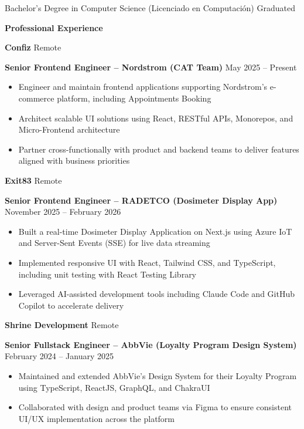 \documentclass[11pt]{article}
\begin{document}
Bachelor's Degree in Computer Science (Licenciado en Computaci\'on) \hfill Graduated

\vspace{12pt}

\begin{center}
    \textbf{Professional Experience}
\end{center}

\textbf{Confiz} \hfill Remote

\textbf{Senior Frontend Engineer -- Nordstrom (CAT Team)} \hfill May 2025 -- Present
\begin{itemize}[noitemsep, topsep=0pt, partopsep=0pt, parsep=0pt]
    \item Engineer and maintain frontend applications supporting Nordstrom's e-commerce platform, including Appointments Booking
    \item Architect scalable UI solutions using React, RESTful APIs, Monorepos, and Micro-Frontend architecture
    \item Partner cross-functionally with product and backend teams to deliver features aligned with business priorities
\end{itemize}

\vspace{12pt}

\textbf{Exit83} \hfill Remote

\textbf{Senior Frontend Engineer -- RADETCO (Dosimeter Display App)} \hfill November 2025 -- February 2026
\begin{itemize}[noitemsep, topsep=0pt, partopsep=0pt, parsep=0pt]
    \item Built a real-time Dosimeter Display Application on Next.js using Azure IoT and Server-Sent Events (SSE) for live data streaming
    \item Implemented responsive UI with React, Tailwind CSS, and TypeScript, including unit testing with React Testing Library
    \item Leveraged AI-assisted development tools including Claude Code and GitHub Copilot to accelerate delivery
\end{itemize}

\vspace{12pt}

\textbf{Shrine Development} \hfill Remote

\textbf{Senior Fullstack Engineer -- AbbVie (Loyalty Program Design System)} \hfill February 2024 -- January 2025
\begin{itemize}[noitemsep, topsep=0pt, partopsep=0pt, parsep=0pt]
    \item Maintained and extended AbbVie's Design System for their Loyalty Program using TypeScript, ReactJS, GraphQL, and ChakraUI
    \item Collaborated with design and product teams via Figma to ensure consistent UI/UX implementation across the platform
\end{itemize}
\end{document}
